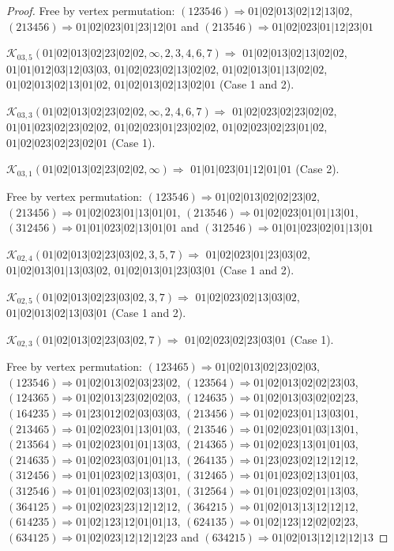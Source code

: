 \documentclass[12pt]{article}
\theoremstyle{plain}
\theoremstyle{definition}
\theoremstyle{remark}
\newcommand{\fancy}[1]{\mathcal{#1}}
\def\K{\fancy{K}}
\begin{document}
\begin{proof}
	
	
	Free by vertex permutation: $(1 2 3 5 4 6)\Rightarrow 01|02|013|02|12|13|02$, $(2 1 3 4 5 6)\Rightarrow 01|02|023|01|23|12|01$ and $(2 1 3 5 4 6)\Rightarrow 01|02|023|01|12|23|01$
	
	
	
	\bigskip
	
	$\K_{03,5}(01|02|013|02|23|02|02,\infty,2, 3, 4, 6, 7)\Rightarrow $ $01|02|013|02|13|02|02$, $01|01|012|03|12|03|03$, $01|02|023|02|13|02|02$, $01|02|013|01|13|02|02$, $01|02|013|02|13|01|02$, $01|02|013|02|13|02|01$ (Case 1 and 2).
	
	$\K_{03,3}(01|02|013|02|23|02|02,\infty,2, 4, 6, 7)\Rightarrow $ $01|02|023|02|23|02|02$, $01|01|023|02|23|02|02$, $01|02|023|01|23|02|02$, $01|02|023|02|23|01|02$, $01|02|023|02|23|02|01$ (Case 1).
	
	$\K_{03,1}(01|02|013|02|23|02|02,\infty)\Rightarrow $ $01|01|023|01|12|01|01$ (Case 2).
	
	
	
	Free by vertex permutation: $(1 2 3 5 4 6)\Rightarrow 01|02|013|02|02|23|02$, $(2 1 3 4 5 6)\Rightarrow 01|02|023|01|13|01|01$, $(2 1 3 5 4 6)\Rightarrow 01|02|023|01|01|13|01$, $(3 1 2 4 5 6)\Rightarrow 01|01|023|02|13|01|01$ and $(3 1 2 5 4 6)\Rightarrow 01|01|023|02|01|13|01$
	
	
	
	\bigskip
	
	$\K_{02,4}(01|02|013|02|23|03|02,3, 5, 7)\Rightarrow $ $01|02|023|01|23|03|02$, $01|02|013|01|13|03|02$, $01|02|013|01|23|03|01$ (Case 1 and 2).
	
	$\K_{02,5}(01|02|013|02|23|03|02,3, 7)\Rightarrow $ $01|02|023|02|13|03|02$, $01|02|013|02|13|03|01$ (Case 1 and 2).
	
	$\K_{02,3}(01|02|013|02|23|03|02,7)\Rightarrow $ $01|02|023|02|23|03|01$ (Case 1).
	
	
	
	Free by vertex permutation: $(1 2 3 4 6 5)\Rightarrow 01|02|013|02|23|02|03$, $(1 2 3 5 4 6)\Rightarrow 01|02|013|02|03|23|02$, $(1 2 3 5 6 4)\Rightarrow 01|02|013|02|02|23|03$, $(1 2 4 3 6 5)\Rightarrow 01|02|013|23|02|02|03$, $(1 2 4 6 3 5)\Rightarrow 01|02|013|03|02|02|23$, $(1 6 4 2 3 5)\Rightarrow 01|23|012|02|03|03|03$, $(2 1 3 4 5 6)\Rightarrow 01|02|023|01|13|03|01$, $(2 1 3 4 6 5)\Rightarrow 01|02|023|01|13|01|03$, $(2 1 3 5 4 6)\Rightarrow 01|02|023|01|03|13|01$, $(2 1 3 5 6 4)\Rightarrow 01|02|023|01|01|13|03$, $(2 1 4 3 6 5)\Rightarrow 01|02|023|13|01|01|03$, $(2 1 4 6 3 5)\Rightarrow 01|02|023|03|01|01|13$, $(2 6 4 1 3 5)\Rightarrow 01|23|023|02|12|12|12$, $(3 1 2 4 5 6)\Rightarrow 01|01|023|02|13|03|01$, $(3 1 2 4 6 5)\Rightarrow 01|01|023|02|13|01|03$, $(3 1 2 5 4 6)\Rightarrow 01|01|023|02|03|13|01$, $(3 1 2 5 6 4)\Rightarrow 01|01|023|02|01|13|03$, $(3 6 4 1 2 5)\Rightarrow 01|02|023|23|12|12|12$, $(3 6 4 2 1 5)\Rightarrow 01|02|013|13|12|12|12$, $(6 1 4 2 3 5)\Rightarrow 01|02|123|12|01|01|13$, $(6 2 4 1 3 5)\Rightarrow 01|02|123|12|02|02|23$, $(6 3 4 1 2 5)\Rightarrow 01|02|023|12|12|12|23$ and $(6 3 4 2 1 5)\Rightarrow 01|02|013|12|12|12|13$
	

\end{proof}
\end{document}
